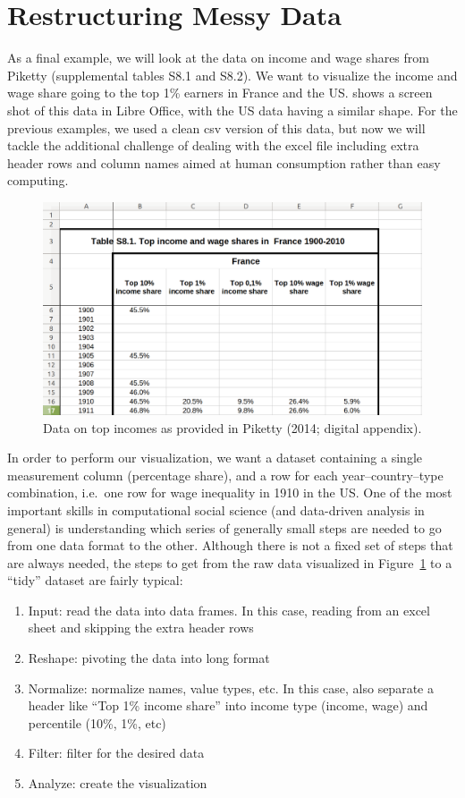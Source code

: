 \section{Restructuring Messy Data}

As a final example, we will look at the data on income and wage shares from Piketty (supplemental tables S8.1 and S8.2).
We want to visualize the income and wage share going to the top 1\% earners in France and the US.
 shows a screen shot of this data in Libre Office, with the US data having a similar shape.
For the previous examples, we used a clean csv version of this data, but now we will tackle the additional challenge
of dealing with the excel file including extra header rows and column names aimed at human consumption rather than easy computing.

\begin{figure}
  \includegraphics[width=\linewidth]{chapter06/messy.png}
  \caption{Data on top incomes as provided in Piketty (2014; digital appendix).}\label{fig:messy}
\end{figure}

In order to perform our visualization, we want a dataset containing a single measurement column (percentage share),
and a row for each year--country--type combination, i.e.\ one row for wage inequality in 1910 in the US.
One of the most important skills in computational social science (and data-driven analysis in general) is
understanding which series of generally small steps are needed to go from one data format to the other.
Although there is not a fixed set of steps that are always needed, the steps to get from the raw data visualized in Figure~\ref{fig:messy} to a ``tidy'' dataset are fairly typical:

\begin{enumerate}
  \item Input:  read the data into data frames. In this case, reading from an excel sheet and skipping the extra header rows
  \item Reshape: pivoting the data into long format
  \item Normalize: normalize names, value types, etc. In this case, also separate a header like ``Top 1\% income share'' into income type (income, wage) and percentile (10\%, 1\%, etc)
  \item Filter: filter for the desired data
  \item Analyze: create the visualization
\end{enumerate}

